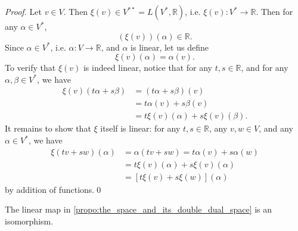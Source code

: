 \documentclass[notoc,notitlepage]{tufte-book}
\begin{document}
\begin{proof}

  Let $v \in V$. Then $\xi(v) \in V^{**} = L(V^*, \mathbb{R})$,
  i.e. $\xi(v) : V^* \to \mathbb{R}$. Then for any $\alpha \in V^*$,
  \begin{equation*}
    \left( \xi(v) \right)(\alpha) \in \mathbb{R}.
  \end{equation*}
  Since $\alpha \in V^*$, i.e. $\alpha : V \to \mathbb{R}$,
  and $\alpha$ is linear, let us define
  \begin{equation*}
    \xi(v)(\alpha) = \alpha(v).
  \end{equation*}
  To verify that $\xi(v)$ is indeed linear, notice that
  for any $t, s \in \mathbb{R}$, and for any $\alpha, \beta \in V^*$,
  we have
  \begin{align*}
    \xi(v)(t \alpha + s \beta)
      &= (t \alpha + s \beta) (v) \\
      &= t \alpha(v) + s \beta(v) \\
      &= t \xi(v)(\alpha) + s \xi(v)(\beta).
  \end{align*}
  It remains to show that $\xi$ itself is linear:
  for any $t, s \in \mathbb{R}$, any $v, w \in V$,
  and any $\alpha \in V^*$, we have
  \begin{align*}
    \xi(tv + sw)(\alpha)
      &= \alpha (tv + sw) = t \alpha(v) + s \alpha(w) \\
      &= t \xi(v)(\alpha) + s \xi(v)(\alpha) \\
      &= [ t \xi(v) + s \xi(w) ](\alpha)
  \end{align*}
  by addition of functions.\qed\
\end{proof}

\begin{propo}\label{propo:isomorphism_between_the_space_and_its_dual_space}
  The linear map in \cref{propo:the_space_and_its_double_dual_space} is an isomorphism.
\end{propo}
\end{document}
